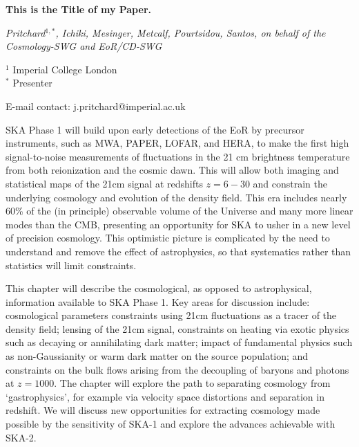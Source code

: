 \documentclass[12pt,a4paper]{article}
\begin{document}
\noindent
{\Large\bf
This is the Title of my Paper.
} %

\noindent
{\em 
Pritchard$^{1,*}$, Ichiki, Mesinger, Metcalf, Pourtsidou, Santos, on behalf of the Cosmology-SWG and EoR/CD-SWG} %

\noindent
$^1$ Imperial College London\\
$^*$ Presenter

\noindent
E-mail contact: j.pritchard@imperial.ac.uk

SKA Phase 1 will build upon early detections of the EoR by precursor instruments, such as MWA, PAPER, LOFAR, and HERA, to make the first high signal-to-noise measurements of fluctuations in the 21 cm brightness temperature from both reionization and the cosmic dawn. This will allow both imaging and statistical maps of the 21cm signal at redshifts $z=6-30$ and constrain the underlying cosmology and evolution of the density field. This era includes nearly 60\% of the (in principle) observable volume of the Universe and many more linear modes than the CMB, presenting an opportunity for SKA to usher in a new level of precision cosmology. This optimistic picture is complicated by the need to understand and remove the effect of astrophysics, so that systematics rather than statistics will limit constraints.

This chapter will describe the cosmological, as opposed to astrophysical, information available to SKA Phase 1. Key areas for discussion include: cosmological parameters constraints using 21cm fluctuations as a tracer of the density field; lensing of the 21cm signal, constraints on heating via exotic physics such as decaying or annihilating dark matter; impact of fundamental physics such as non-Gaussianity or warm dark matter on the source population; and constraints on the bulk flows arising from the decoupling of baryons and photons at $z=1000$. The chapter will explore the path to separating cosmology from `gastrophysics', for example via velocity space distortions and separation in redshift. We will discuss new opportunities for extracting cosmology made possible by the sensitivity of SKA-1 and explore the advances achievable with SKA-2.
\end{document}
